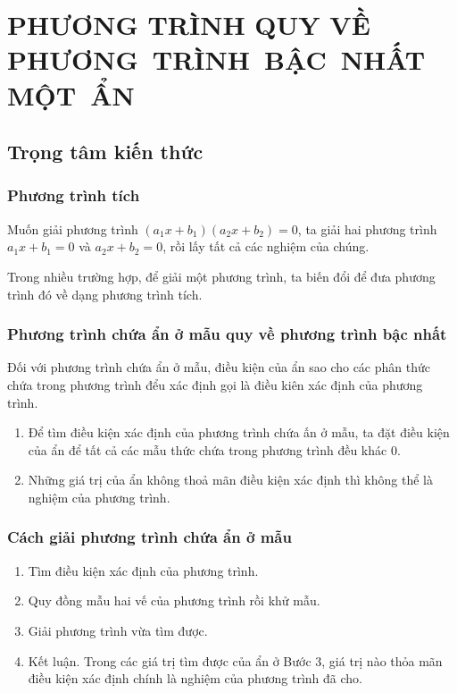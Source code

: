 \setcounter{section}{0}
\section{PHƯƠNG TRÌNH QUY VỀ PHƯƠNG~TRÌNH~BẬC~NHẤT~MỘT~ẨN}
\subsection{Trọng tâm kiến thức}
\begin{tomtat}
\subsubsection{Phương trình tích}
\begin{boxdn}
	Muốn giải phương trình $\left(a_1x+b_1\right)\left(a_2x+b_2\right)=0$, ta giải hai phương trình $a_1x+b_1=0$ và $a_2x+b_2=0$, rồi lấy tất cả các nghiệm của chúng.
\end{boxdn}
\begin{note}
	Trong nhiều trường hợp, để giải một phương trình, ta biến đổi để đưa phương trình đó về dạng phương trình tích.
\end{note}
\subsubsection{Phương trình chứa ẩn ở mẫu quy về phương trình bậc nhất}
\begin{boxdn} Đối với phương trình chứa ẩn ở mẫu, điều kiện của ẩn sao cho các phân thức chứa trong phương trình đểu xác định gọi là điều kiên xác định của phương trình.
\end{boxdn}
\begin{note}
\begin{enumerate}[\bf --]
	\item Để tìm điều kiện xác định của phương trình chứa ấn ở mẫu, ta đặt điều kiện của ẩn để tất cả các mẫu thức chứa trong phương trình đều khác 0.
	\item Những giá trị của ẩn không thoả mãn điều kiện xác định thì không thể là nghiệm của phương trình.
\end{enumerate}
\end{note}
\begin{boxdl}
	\subsubsection*{Cách giải phương trình chứa ẩn ở mẫu}
	\begin{enumerate}[\it\bf Bước 1.]
		\item Tìm điều kiện xác định của phương trình.
		\item Quy đồng mẫu hai vế của phương trình rồi khử mẫu.
		\item Giải phương trình vừa tìm được.
		\item Kết luận. Trong các giá trị tìm được của ẩn ở Bước 3, giá trị nào thỏa mãn điều kiện xác định chính là nghiệm của phương trình đã cho.
	\end{enumerate}
\end{boxdl}
\end{tomtat}
